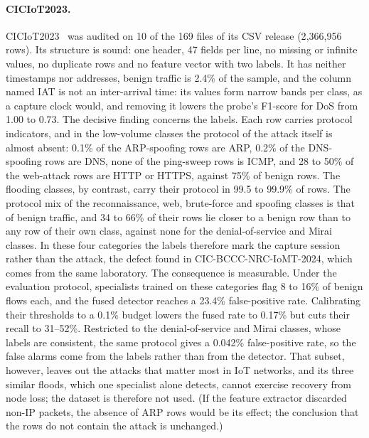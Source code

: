 \paragraph{CICIoT2023.}
CICIoT2023~\cite{neto2023ciciot2023} was audited on 10 of the 169 files of its CSV
release (2{,}366{,}956 rows). Its structure is sound: one header, 47 fields per line, no
missing or infinite values, no duplicate rows and no feature vector with two labels. It
has neither timestamps nor addresses, benign traffic is 2.4\% of the sample, and the
column named IAT is not an inter-arrival time: its values form narrow bands per class, as
a capture clock would, and removing it lowers the probe's F1-score for DoS from 1.00 to
0.73. The decisive finding concerns the labels. Each row carries protocol indicators, and
in the low-volume classes the protocol of the attack itself is almost absent: 0.1\% of
the ARP-spoofing rows are ARP, 0.2\% of the DNS-spoofing rows are DNS, none of the
ping-sweep rows is ICMP, and 28 to 50\% of the web-attack rows are HTTP or HTTPS, against
75\% of benign rows. The flooding classes, by contrast, carry their protocol in 99.5 to
99.9\% of rows. The protocol mix of the reconnaissance, web, brute-force and spoofing
classes is that of benign traffic, and 34 to 66\% of their rows lie closer to a benign row
than to any row of their own class, against none for the denial-of-service and Mirai
classes. In these four categories the labels therefore mark the capture session rather
than the attack, the defect found in CIC-BCCC-NRC-IoMT-2024, which comes from the same
laboratory. The consequence is measurable. Under the evaluation protocol, specialists
trained on these categories flag 8 to 16\% of benign flows each, and the fused detector
reaches a 23.4\% false-positive rate. Calibrating their thresholds to a 0.1\% budget
lowers the fused rate to 0.17\% but cuts their recall to 31--52\%. Restricted to the
denial-of-service and Mirai classes, whose labels are consistent, the same protocol gives
a 0.042\% false-positive rate, so the false alarms come from the labels rather than from
the detector. That subset, however, leaves out the attacks that matter most in IoT
networks, and its three similar floods, which one specialist alone detects, cannot
exercise recovery from node loss; the dataset is therefore not used. (If the
feature extractor discarded non-IP packets, the absence of ARP rows would be its effect;
the conclusion that the rows do not contain the attack is unchanged.)

